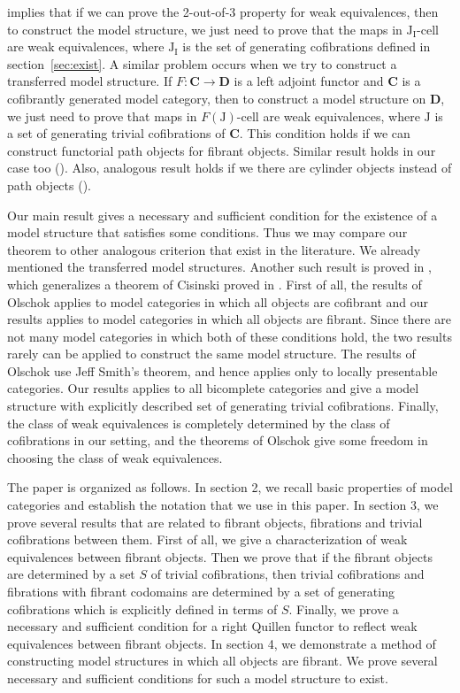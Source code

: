 \documentclass{tac}
\theoremstyle{definition}
\newcommand{\cat}[1]{\mathbf{#1}}
\newcommand{\C}{\cat{C}}
\newcommand{\D}{\cat{D}}
\newcommand{\I}{\mathrm{I}}
\newcommand{\J}{\mathrm{J}}
\newcommand{\class}[2]{#1\text{-}\mathrm{#2}}
\newcommand{\Icell}[1][\I]{\class{#1}{cell}}
\newcommand{\Jcell}[1][]{\Icell[\J#1]}
\begin{document}
 implies that if we can prove the 2-out-of-3 property for weak equivalences,
then to construct the model structure, we just need to prove that the maps in $\Jcell[_\I]$ are weak equivalences,
where $\J_\I$ is the set of generating cofibrations defined in section~\ref{sec:exist}.
A similar problem occurs when we try to construct a transferred model structure.
If $F : \C \to \D$ is a left adjoint functor and $\C$ is a cofibrantly generated model category, then to construct a model structure on $\D$,
we just need to prove that maps in $\Icell[F(\J)]$ are weak equivalences, where $\J$ is a set of generating trivial cofibrations of $\C$.
This condition holds if we can construct functorial path objects for fibrant objects.
Similar result holds in our case too ().
Also, analogous result holds if we there are cylinder objects instead of path objects ().

Our main result gives a necessary and sufficient condition for the existence of a model structure that satisfies some conditions.
Thus we may compare our theorem to other analogous criterion that exist in the literature.
We already mentioned the transferred model structures.
Another such result is proved in \cite{olschok}, which generalizes a theorem of Cisinski proved in \cite{cisinski}.
First of all, the results of Olschok applies to model categories in which all objects are cofibrant and our results applies to model categories in which all objects are fibrant.
Since there are not many model categories in which both of these conditions hold, the two results rarely can be applied to construct the same model structure.
The results of Olschok use Jeff Smith's theorem, and hence applies only to locally presentable categories.
Our results applies to all bicomplete categories and give a model structure with explicitly described set of generating trivial cofibrations.
Finally, the class of weak equivalences is completely determined by the class of cofibrations in our setting,
and the theorems of Olschok give some freedom in choosing the class of weak equivalences.

The paper is organized as follows.
In section 2, we recall basic properties of model categories and establish the notation that we use in this paper.
In section 3, we prove several results that are related to fibrant objects, fibrations and trivial cofibrations between them.
First of all, we give a characterization of weak equivalences between fibrant objects.
Then we prove that if the fibrant objects are determined by a set $S$ of trivial cofibrations,
then trivial cofibrations and fibrations with fibrant codomains are determined by a set of generating cofibrations which is explicitly defined in terms of $S$.
Finally, we prove a necessary and sufficient condition for a right Quillen functor to reflect weak equivalences between fibrant objects.
In section 4, we demonstrate a method of constructing model structures in which all objects are fibrant.
We prove several necessary and sufficient conditions for such a model structure to exist.
\end{document}
